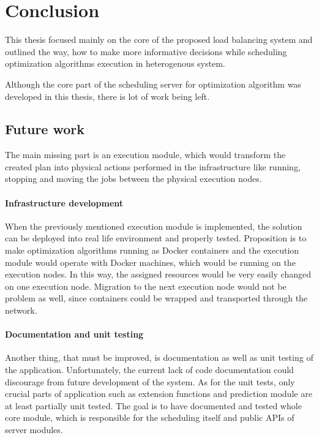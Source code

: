 \chapter{Conclusion}\label{ch:conclusion}
This thesis focused mainly on the core of the proposed load balancing system
and outlined the way,
how to make more informative decisions while scheduling optimization algorithms execution in heterogenous system.

Although the core part of the scheduling server for optimization algorithm was developed in this thesis,
there is lot of work being left.

\section{Future work}\label{sec:future-work}
The main missing part is an execution module, 
which would transform the created plan into physical actions performed in the infrastructure 
like running, stopping and moving the jobs between the physical execution nodes.

\subsubsection{Infrastructure development}
When the previously mentioned execution module is implemented,
the solution can be deployed into real life environment and properly tested.
Proposition is to make optimization algorithms running as Docker containers 
and the execution module would operate with Docker machines,
which would be running on the execution nodes. 
In this way, 
the assigned resources would be very easily changed on one execution node.
Migration to the next execution node would not be problem as well, 
since containers could be wrapped and transported through the network.

\subsubsection{Documentation and unit testing}
Another thing, that must be improved, is documentation as well as unit testing of the application.
Unfortunately, the current lack of code documentation could discourage from future development of the system.
As for the unit tests, 
only crucial parts of application such as extension functions and prediction module are at least partially unit tested.
The goal is to have documented and tested whole core module,
which is responsible for the scheduling itself and public APIs of server modules. 

